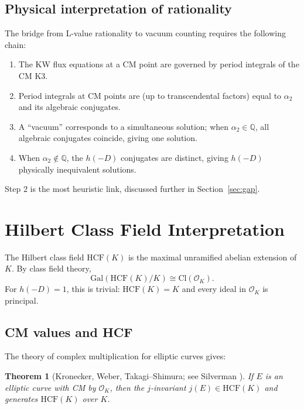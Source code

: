 \documentclass[12pt,a4paper]{article}
\theoremstyle{plain}
\newtheorem{theorem}{Theorem}[section]
\theoremstyle{definition}
\newcommand{\Q}{\mathbb{Q}}
\newcommand{\OK}{\mathcal{O}_K}
\newcommand{\HCF}{\mathrm{HCF}}
\newcommand{\Gal}{\mathrm{Gal}}
\begin{document}
\subsection{Physical interpretation of rationality}

The bridge from L-value rationality to vacuum counting requires the following
chain:
\begin{enumerate}
  \item The KW flux equations at a CM point are governed by period integrals
    of the CM K3.
  \item Period integrals at CM points are (up to transcendental factors)
    equal to $\alpha_2$ and its algebraic conjugates.
  \item A ``vacuum'' corresponds to a simultaneous solution; when $\alpha_2 \in \Q$,
    all algebraic conjugates coincide, giving one solution.
  \item When $\alpha_2 \notin \Q$, the $h(-D)$ conjugates are distinct, giving
    $h(-D)$ physically inequivalent solutions.
\end{enumerate}
Step 2 is the most heuristic link, discussed further in Section~\ref{sec:gap}.

\section{Hilbert Class Field Interpretation}
\label{sec:hcf}

The Hilbert class field $\HCF(K)$ is the maximal unramified abelian extension
of $K$. By class field theory,
\[
  \Gal(\HCF(K)/K) \cong \mathrm{Cl}(\OK).
\]
For $h(-D) = 1$, this is trivial: $\HCF(K) = K$ and every ideal in $\OK$
is principal.

\subsection{CM values and HCF}

The theory of complex multiplication for elliptic curves gives:

\begin{theorem}[Kronecker, Weber, Takagi--Shimura; see Silverman ]
If $E$ is an elliptic curve with CM by $\OK$, then the $j$-invariant
$j(E) \in \HCF(K)$ and generates $\HCF(K)$ over $K$.
\end{theorem}
\end{document}
